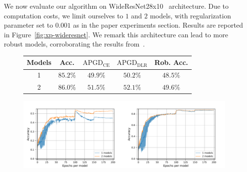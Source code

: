 We now evaluate our algorithm on WideResNet28x10~\cite{ZagoruykoK16} architecture. Due to computation costs, we limit ourselves to $1$ and $2$ models, with regularization parameter set to $0.001$ as in the paper experiments section. Results are reported in Figure~\ref{fig:xp-wideresnet}. We remark this architecture can lead to more robust models, corroborating the results from~\cite{gowal2020uncovering}.
\begin{figure}[!ht]
\begin{center}

\vskip 0.15in
 \begin{minipage}[ht!]{0.39\textwidth}
 \begin{scriptsize}
\begin{tabular}{c|c|ccc} 
\textbf{ Models} & \textbf{Acc. }&\textbf{$\textrm{APGD}_\textrm{CE}$}& \textbf{$\textrm{APGD}_\textrm{DLR}$} & \textbf{Rob. Acc.} \\ \hline
 1 & $85.2\%$ &	$49.9\%$ & $50.2\%$ & $48.5\%$ \\ 
 2 & $\bm{86.0\%}$ & $\bm{51.5\%}$ & $\bm{52.1\%}$ & $\bm{49.6\%}$\\ 

\end{tabular}
\end{scriptsize}
  \end{minipage}\begin{minipage}[!ht]{0.61\textwidth}
\includegraphics[width=0.49\textwidth]{Images/robust_acc_finalrun_WideResNet28x10_1024_200_0.001.pdf}\includegraphics[width=0.49\textwidth]{Images/standard_acc_finalrun_WideResNet28x10_1024_200_0.001.pdf} 
  \end{minipage}
  

\end{center}
\end{figure}
